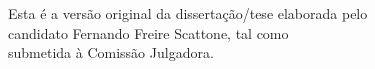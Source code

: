 \documentclass[11pt,twoside,a4paper]{book}
\begin{document}
    \vskip 2cm

    \begin{flushright}
	Esta é a versão original da dissertação/tese elaborada pelo\\
	candidato Fernando Freire Scattone, tal como \\
	submetida à Comissão Julgadora.
    \end{flushright}

\pagebreak


%
%
%
%

%
%
%
%
%
%    
%      
\end{document}
